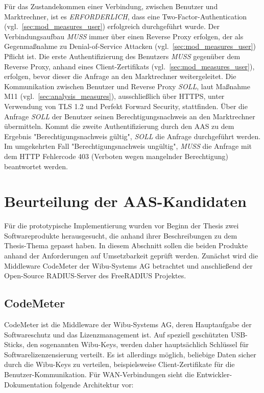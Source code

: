 \documentclass[11pt,a4paper]{report}
\begin{document}
Für das Zustandekommen einer Verbindung, zwischen Benutzer und Marktrechner, ist es \textit{ERFORDERLICH}, dass eine Two-Factor-Authentication (vgl.~\ref{sec:mod_measures_user}) erfolgreich durchgeführt wurde. Der Verbindungsaufbau \textit{MUSS} immer über einen Reverse Proxy erfolgen, der als Gegenmaßnahme zu Denial-of-Service Attacken (vgl.~\ref{sec:mod_measures_user}) Pflicht ist. Die erste Authentifizierung des Benutzers \textit{MUSS} gegenüber dem Reverse Proxy, anhand eines Client-Zertifikats (vgl.~\ref{sec:mod_measures_user}), erfolgen, bevor dieser die Anfrage an den Marktrechner weitergeleitet. Die Kommunikation zwischen Benutzer und Reverse Proxy \textit{SOLL}, laut Maßnahme M11 (vgl.~\ref{sec:analysis_measures}), ausschließlich über HTTPS, unter Verwendung von TLS 1.2 und Perfekt Forward Security, stattfinden. Über die Anfrage \textit{SOLL} der Benutzer seinen Berechtigungsnachweis an den Marktrechner übermitteln. Kommt die zweite Authentifizierung durch den AAS zu dem Ergebnis "Berechtigungsnachweis gültig", \textit{SOLL} die Anfrage durchgeführt werden. Im umgekehrten Fall "Berechtigungsnachweis ungültig", \textit{MUSS} die Anfrage mit dem HTTP Fehlercode 403 (Verboten wegen mangelnder Berechtigung) beantwortet werden.

\section{Beurteilung der AAS-Kandidaten}

Für die prototypische Implementierung wurden vor Beginn der Thesis zwei Softwareprodukte herausgesucht, die anhand ihrer Beschreibungen zu dem Thesis-Thema gepasst haben. In diesem Abschnitt sollen die beiden Produkte anhand der Anforderungen auf Umsetzbarkeit geprüft werden. Zunächst wird die Middleware CodeMeter der Wibu-Systems AG betrachtet und anschließend der Open-Source RADIUS-Server des FreeRADIUS Projektes.

\subsection{CodeMeter}

CodeMeter ist die Middleware der Wibu-Systems AG, deren Hauptaufgabe der Softwareschutz und das Lizenzmanagement ist. Auf speziell geschützten USB-Sticks, den sogenannten Wibu-Keys, werden daher hauptsächlich Schlüssel für Softwarelizenzensierung verteilt. Es ist allerdings möglich, beliebige Daten sicher durch die Wibu-Keys zu verteilen, beispielsweise Client-Zertifikate für die Benutzer-Kommunikation. Für WAN-Verbindungen sieht die Entwickler-Dokumentation folgende Architektur vor:
\end{document}
